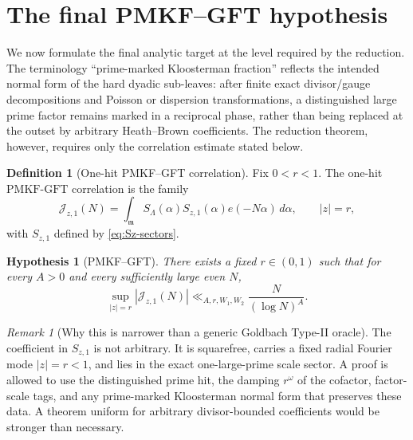 \documentclass[11pt]{article}
\newtheorem{hypothesis}[theorem]{Hypothesis}
\theoremstyle{definition}
\newtheorem{definition}[theorem]{Definition}
\theoremstyle{remark}
\newtheorem{remark}[theorem]{Remark}
\newcommand{\1}{\mathbf 1}
\newcommand{\mcal}{\mathfrak m}
\newcommand{\PMKF}{\mathrm{PMKF}\text{-}\mathrm{GFT}}
\begin{document}
\section{The final PMKF--GFT hypothesis}\label{sec:pmkf}

We now formulate the final analytic target at the level required by the reduction.  The terminology ``prime-marked Kloosterman fraction'' reflects the intended normal form of the hard dyadic sub-leaves: after finite exact divisor/gauge decompositions and Poisson or dispersion transformations, a distinguished large prime factor remains marked in a reciprocal phase, rather than being replaced at the outset by arbitrary Heath--Brown coefficients.  The reduction theorem, however, requires only the correlation estimate stated below.

\begin{definition}[One-hit PMKF--GFT correlation]\label{def:pmkf-correlation}
Fix $0<r<1$.  The one-hit $\PMKF$ correlation is the family
\begin{equation}\label{eq:pmkf-family}
\mathcal J_{z,1}(N)
=
\int_{\mcal}S_\Lambda(\alpha)S_{z,1}(\alpha)e(-N\alpha)\,d\alpha,
\qquad |z|=r,
\end{equation}
with $S_{z,1}$ defined by \eqref{eq:Sz-sectors}.
\end{definition}

\begin{hypothesis}[PMKF--GFT]\label{hyp:PMKF}
There exists a fixed $r\in(0,1)$ such that for every $A>0$ and every sufficiently large even $N$,
\begin{equation}\label{eq:PMKF}
\boxed{
\sup_{|z|=r}|\mathcal J_{z,1}(N)|
\ll_{A,r,W_1,W_2}
\frac{N}{(\log N)^A}.
}
\end{equation}
\end{hypothesis}

\begin{remark}[Why this is narrower than a generic Goldbach Type-II oracle]
The coefficient in $S_{z,1}$ is not arbitrary.  It is squarefree, carries a fixed radial Fourier mode $|z|=r<1$, and lies in the exact one-large-prime scale sector.  A proof is allowed to use the distinguished prime hit, the damping $r^{\omega}$ of the cofactor, factor-scale tags, and any prime-marked Kloosterman normal form that preserves these data.  A theorem uniform for arbitrary divisor-bounded coefficients would be stronger than necessary.
\end{remark}
\end{document}
